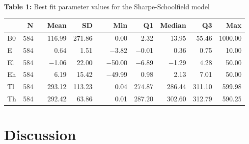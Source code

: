 \documentclass[fontsize=11pt]{scrartcl}\usepackage[]{graphicx}\usepackage[]{color}
\begin{document}
  \begin{table}
    \begin{center}
    \textbf{Table 1:} Best fit parameter values for the Sharpe-Schoolfield model
    \end{center}
\begin{center}
\begin{longtable}{lrrrrrrrrrr}
  \toprule
   & N &   & Mean & SD &   & Min & Q1 & Median & Q3 & Max \\ 
    \cmidrule{2-2}  \cmidrule{4-5} \cmidrule{7-11}
 \endhead
B0 & 584 &  & 116.99 & 271.86 &  & 0.00 & 2.32 & 13.95 & 55.46 & 1000.00 \\ 
  E & 584 &  & 0.64 & 1.51 &  & $-$3.82 & $-$0.01 & 0.36 & 0.75 & 10.00 \\ 
  El & 584 &  & $-$1.06 & 22.00 &  & $-$50.00 & $-$6.89 & $-$1.29 & 4.28 & 50.00 \\ 
  Eh & 584 &  & 6.19 & 15.42 &  & $-$49.99 & 0.98 & 2.13 & 7.01 & 50.00 \\ 
  Tl & 584 &  & 293.12 & 113.23 &  & 0.04 & 274.87 & 286.44 & 311.10 & 599.98 \\ 
  Th & 584 &  & 292.42 & 63.86 &  & 0.01 & 287.20 & 302.60 & 312.79 & 590.25 \\ 
   \bottomrule
\end{longtable}
\end{center}

  \end{table}

  \section{Discussion}
\end{document}
